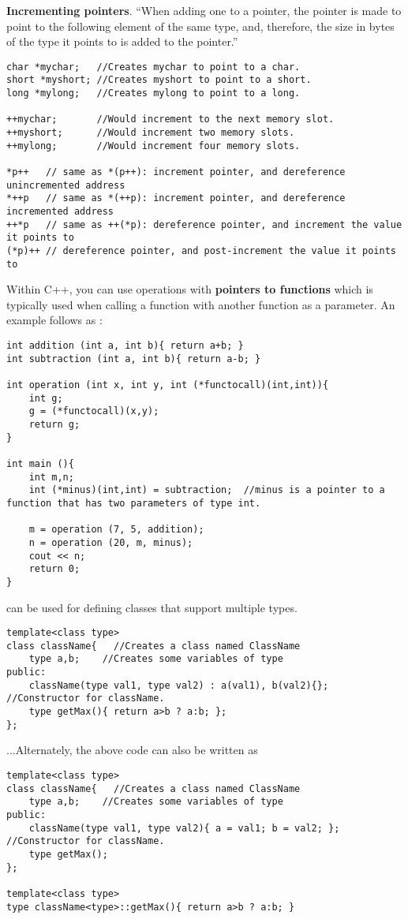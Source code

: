 \textbf{Incrementing pointers}. ``When adding one to a pointer, the pointer is made to point to the following element of the same type, and, therefore, the size in bytes of the type it points to is added to the pointer.''
\begin{lstlisting}
char *mychar;   //Creates mychar to point to a char.
short *myshort; //Creates myshort to point to a short.
long *mylong;   //Creates mylong to point to a long.

++mychar;       //Would increment to the next memory slot.
++myshort;      //Would increment two memory slots.
++mylong;       //Would increment four memory slots.

*p++   // same as *(p++): increment pointer, and dereference unincremented address
*++p   // same as *(++p): increment pointer, and dereference incremented address
++*p   // same as ++(*p): dereference pointer, and increment the value it points to
(*p)++ // dereference pointer, and post-increment the value it points to 
\end{lstlisting}

Within C++, you can use operations with \textbf{pointers to functions} which is typically used when calling a function with another function as a parameter. An example follows as \cite{cpp:pointers}:
\begin{lstlisting}
int addition (int a, int b){ return a+b; }
int subtraction (int a, int b){ return a-b; }

int operation (int x, int y, int (*functocall)(int,int)){
	int g;
	g = (*functocall)(x,y);
	return g;
}

int main (){
	int m,n;
	int (*minus)(int,int) = subtraction;  //minus is a pointer to a function that has two parameters of type int.
	
	m = operation (7, 5, addition);
	n = operation (20, m, minus);
	cout << n;
	return 0;
}
\end{lstlisting}

 can be used for defining classes that support multiple types. 
\begin{lstlisting}
template<class type>
class className{   //Creates a class named ClassName
	type a,b;    //Creates some variables of type
public:
	className(type val1, type val2) : a(val1), b(val2){};  //Constructor for className.
	type getMax(){ return a>b ? a:b; };
};
\end{lstlisting}
...Alternately, the above code can also be written as
\begin{lstlisting}
template<class type>
class className{   //Creates a class named ClassName
	type a,b;    //Creates some variables of type
public:
	className(type val1, type val2){ a = val1; b = val2; };  //Constructor for className.
	type getMax();
};

template<class type>
type className<type>::getMax(){ return a>b ? a:b; }
\end{lstlisting}

